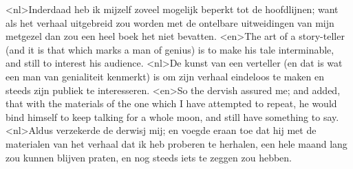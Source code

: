 <nl>Inderdaad heb ik mijzelf zoveel mogelijk beperkt tot de hoofdlijnen; want als het verhaal uitgebreid zou worden met de ontelbare uitweidingen van mijn metgezel dan zou een heel boek het niet bevatten.
<en>The art of a story-teller (and it is that which marks a man of genius) is to make his tale interminable, and still to interest his audience.
<nl>De kunst van een verteller (en dat is wat een man van genialiteit kenmerkt) is om zijn verhaal eindeloos te maken en steeds zijn publiek te interesseren.
<en>So the dervish assured me; and added, that with the materials of the one which I have attempted to repeat, he would bind himself to keep talking for a whole moon, and still have something to say.
<nl>Aldus verzekerde de derwisj mij; en voegde eraan toe dat hij met de materialen van het verhaal dat ik heb proberen te herhalen,  een hele maand lang zou kunnen blijven praten, en nog steeds iets te zeggen zou hebben.
